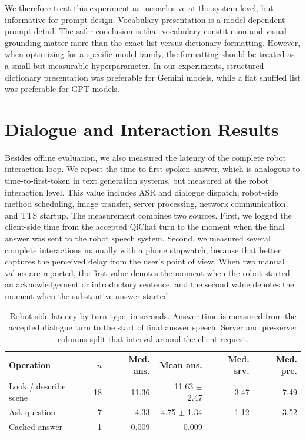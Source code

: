 We therefore treat this experiment as inconclusive at the system level, but informative for prompt design. Vocabulary presentation is a model-dependent prompt detail. The safer conclusion is that vocabulary constitution and visual grounding matter more than the exact list-versus-dictionary formatting. However, when optimizing for a specific model family, the formatting should be treated as a small but measurable hyperparameter. In our experiments, structured dictionary presentation was preferable for Gemini models, while a flat shuffled list was preferable for GPT models.

\section{Dialogue and Interaction Results}

Besides offline evaluation, we also measured the latency of the complete robot interaction loop. We report the time to first spoken answer, which is analogous to time-to-first-token in text generation systems, but measured at the robot interaction level. This value includes ASR and dialogue dispatch, robot-side method scheduling, image transfer, server processing, network communication, and TTS startup. The measurement combines two sources. First, we logged the client-side time from the accepted QiChat turn to the moment when the final answer was sent to the robot speech system. Second, we measured several complete interactions manually with a phone stopwatch, because that better captures the perceived delay from the user's point of view. When two manual values are reported, the first value denotes the moment when the robot started an acknowledgement or introductory sentence, and the second value denotes the moment when the substantive answer started.

\begin{table}[!htbp]
\centering
\caption[Robot-side latency by turn type.]{Robot-side latency by turn type, in seconds. Answer time is measured from the accepted dialogue turn to the start of final answer speech. Server and pre-server columns split that interval around the client request.}\label{tab:robot-latency}
\scriptsize
\begin{tabular}{@{}lrrrrr@{}}
\toprule
Operation & $n$ & Med. ans. & Mean ans. & Med. srv. & Med. pre. \\
\midrule
Look / describe scene & 18 & 11.36 & 11.63 $\pm$ 2.47 & 3.47 & 7.49 \\
Ask question & 7 & 4.33 & 4.75 $\pm$ 1.34 & 1.12 & 3.52 \\
Cached answer & 1 & 0.009 & 0.009 & -- & -- \\
\bottomrule
\end{tabular}
\end{table}

